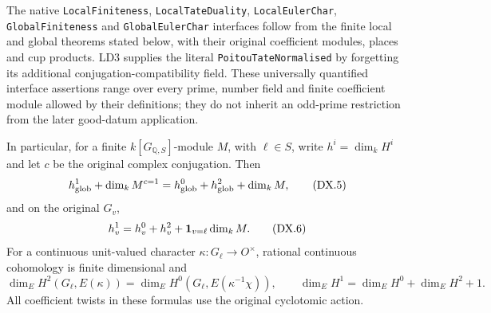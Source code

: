 \begin{proposition}
\label{claim:DX1}
The native \texttt{LocalFiniteness}, \texttt{LocalTateDuality},
\texttt{LocalEulerChar}, \texttt{GlobalFiniteness} and
\texttt{GlobalEulerChar} interfaces follow from the finite local
and global theorems stated below, with their original coefficient
modules, places and cup products.  LD3 supplies the literal
\texttt{PoitouTateNormalised} by forgetting its additional
conjugation-compatibility field.
These universally quantified interface assertions range over
every prime, number field and finite coefficient module
allowed by their definitions; they do not inherit an
odd-prime restriction from the later good-datum application.

In particular, for a finite $k[G_{\mathbb Q,S}]$-module $M$,
with $\ell\in S$, write $h^i=\dim_kH^i$ and let $c$ be the
original complex conjugation.  Then
\[
 h^1_{\rm glob}+ \dim_k M^{c=1}
       =h^0_{\rm glob}+h^2_{\rm glob}+\dim_k M,
 \tag{DX.5}
\]
and on the original $G_v$,
\[
 h^1_v=h^0_v+h^2_v+
                  {\bf1}_{v=\ell}\dim_kM .
 \tag{DX.6}
\]
For a continuous unit-valued character
$\kappa:G_\ell\to O^\times$, rational continuous cohomology is
finite dimensional and
\[
 \dim_EH^2(G_\ell,E(\kappa))
       =\dim_E H^0(G_\ell,E(\kappa^{-1}\chi)),\qquad
 \dim_EH^1=\dim_EH^0+\dim_EH^2+1 .
 \tag{DX.7}
\]
All coefficient twists in these formulas use the original
cyclotomic action.
\end{proposition}

